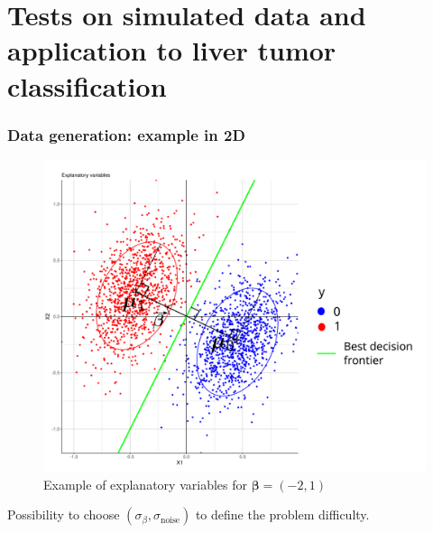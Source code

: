 \documentclass{beamer}
\begin{document}
\section{Tests on simulated data and application to liver tumor classification}  
\begin{frame}
  \sectionpage
\end{frame}


\begin{frame}
    \frametitle{Data generation: example in 2D}

    \begin{figure}
        \centering
        \includegraphics[scale = 0.2]{images/2D_better.png}
        \caption{Example of explanatory variables for $\bm{\beta} = (-2,1)$}
    \end{figure}
    Possibility to choose $(\sigma_\beta,\sigma_{\text{noise}})$ to define the problem difficulty.
\end{frame}
\end{document}
